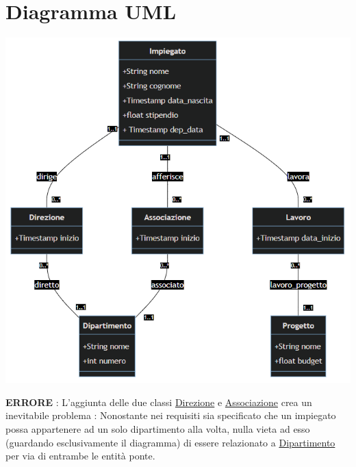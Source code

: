 \documentclass[12pt, letterpaper]{article}
\begin{document}
\section{Diagramma UML}
\begin{center}
    \includegraphics[width=1\textwidth ]{UML_ita2.png}
\end{center}
\color{red} \textbf{ERRORE} : \color{black} L'aggiunta delle due classi \underline{Direzione}
e \underline{Associazione} crea un inevitabile problema : Nonostante nei requisiti sia specificato 
che un impiegato possa appartenere ad un solo dipartimento alla volta, nulla vieta ad esso 
(guardando esclusivamente il diagramma) di essere relazionato a \underline{Dipartimento} per 
via di entrambe le entità ponte.
\end{document}
